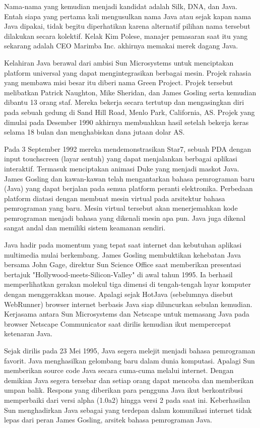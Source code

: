 Nama-nama yang kemudian menjadi kandidat adalah Silk, DNA, dan Java. Entah siapa yang pertama kali mengusulkan nama Java atau sejak kapan nama Java dipakai, tidak begitu diperhatikan karena alternatif pilihan nama tersebut dilakukan secara kolektif. Kelak Kim Polese, manajer pemasaran saat itu yang sekarang adalah CEO Marimba Inc. akhirnya memakai merek dagang Java.

Kelahiran Java berawal dari ambisi Sun Microsystems untuk menciptakan platform universal yang dapat mengintegrasikan berbagai mesin. Projek rahasia yang membawa misi besar itu diberi nama Green Project. Projek tersebut melibatkan Patrick Naughton, Mike Sheridan, dan James Gosling serta kemudian dibantu 13 orang staf. Mereka bekerja secara tertutup dan mengasingkan diri pada sebuah gedung di Sand Hill Road, Menlo Park, California, AS. Projek yang dimulai pada Desember 1990 akhirnya membuahkan hasil setelah bekerja keras selama 18 bulan dan menghabiskan dana jutaan dolar AS.

Pada 3 September 1992 mereka mendemonstrasikan Star7, sebuah PDA dengan input touchscreen (layar sentuh) yang dapat menjalankan berbagai aplikasi interaktif. Termasuk menciptakan animasi Duke yang menjadi maskot Java. James Gosling dan kawan-kawan telah mengantarkan bahasa pemrograman baru (Java) yang dapat berjalan pada semua platform peranti elektronika. Perbedaan platform diatasi dengan membuat mesin virtual pada arsitektur bahasa pemrograman yang baru. Mesin virtual tersebut akan menerjemahkan kode pemrograman menjadi bahasa yang dikenali mesin apa pun. Java juga dikenal sangat andal dan memiliki sistem keamanan sendiri.

Java hadir pada momentum yang tepat saat internet dan kebutuhan aplikasi multimedia mulai berkembang. James Gosling membuktikan kehebatan Java bersama John Gage, direktur Sun Science Office saat memberikan presentasi bertajuk "Hollywood-meets-Silicon-Valley" di awal tahun 1995. Ia berhasil memperlihatkan gerakan molekul tiga dimensi di tengah-tengah layar komputer dengan menggerakkan mouse. Apalagi sejak HotJava (sebelumnya disebut WebRunner) browser internet berbasis Java siap diluncurkan sebulan kemudian. Kerjasama antara Sun Microsystems dan Netscape untuk memasang Java pada browser Netscape Communicator saat dirilis kemudian ikut mempercepat ketenaran Java.

Sejak dirilis pada 23 Mei 1995, Java segera melejit menjadi bahasa pemrograman favorit. Java menghasilkan gelombang baru dalam dunia komputasi. Apalagi Sun memberikan source code Java secara cuma-cuma melalui internet. Dengan demikian Java segera tersebar dan setiap orang dapat mencoba dan memberikan umpan balik. Respons yang diberikan para pengguna Java ikut berkontribusi memperbaiki dari versi alpha (1.0a2) hingga versi 2 pada saat ini. Keberhasilan Sun menghadirkan Java sebagai yang terdepan dalam komunikasi internet tidak lepas dari peran James Gosling, arsitek bahasa pemrograman Java.

